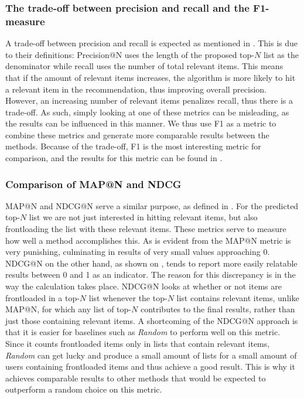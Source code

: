 \subsubsection{The trade-off between precision and recall and the F1-measure}\label{subsub:precrectradeoff}
A trade-off between precision and recall is expected as mentioned in .
This is due to their definitions: Precision@N uses the length of the proposed top-$N$ list as the denominator while recall uses the number of total relevant items.
This means that if the amount of relevant items increases, the algorithm is more likely to hit a relevant item in the recommendation, thus improving overall precision.
However, an increasing number of relevant items penalizes recall, thus there is a trade-off.
As such, simply looking at one of these metrics can be misleading, as the results can be influenced in this manner.
We thus use F1 as a metric to combine these metrics and generate more comparable results between the methods.
Because of the trade-off, F1 is the most interesting metric for comparison, and the results for this metric can be found in .

\subsubsection{Comparison of MAP@N and NDCG}
MAP@N and NDCG@N serve a similar purpose, as defined in .
For the predicted top-$N$ list we are not just interested in hitting relevant items, but also frontloading the list with these relevant items.
These metrics serve to measure how well a method accomplishes this.
As is evident from  the MAP@N metric is very punishing, culminating in results of very small values approaching 0.
NDCG@N on the other hand, as shown on , tends to report more easily relatable results between 0 and 1 as an indicator.
The reason for this discrepancy is in the way the calculation takes place.
NDCG@N looks at whether or not items are frontloaded in a top-$N$ list whenever the top-$N$ list contains relevant items, unlike MAP@N, for which any list of top-$N$ contributes to the final results, rather than just those containing relevant items.
A shortcoming of the NDCG@N approach is that it is easier for baselines such as \textit{Random} to perform well on this metric.
Since it counts frontloaded items only in lists that contain relevant items, \textit{Random} can get lucky and produce a small amount of lists for a small amount of users containing frontloaded items and thus achieve a good result.
This is why it achieves comparable results to other methods that would be expected to outperform a random choice on this metric.

